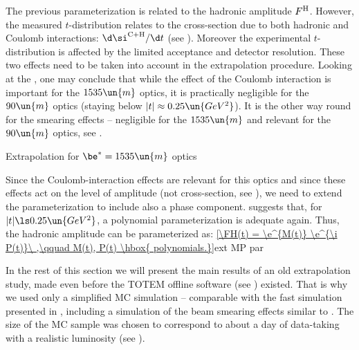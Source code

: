 
The previous parameterization is related to the hadronic amplitude $F^{\rm H}$. However, the measured $t$-distribution relates to the cross-section due to both hadronic and Coulomb interactions: $\d\si^{\rm C+H}/\d t$ (see ). Moreover the experimental $t$-distribution is affected by the limited acceptance and detector resolution. These two effects need to be taken into account in the extrapolation procedure. Looking at the , one may conclude that while the effect of the Coulomb interaction is important for the $1535\un{m}$ optics, it is practically negligible for the $90\un{m}$ optics (staying below $|t| \approx 0.25\un{GeV^2}$). It is the other way round for the smearing effects -- negligible for the $1535\un{m}$ and relevant for the $90\un{m}$ optics, see .

\bmfig
{}
\emfig

\caption{Extrapolation for $\be^* = 1535\un{m}$ optics}

Since the Coulomb-interaction effects are relevant for this optics and since these effects act on the level of amplitude (not cross-section, see ), we need to extend the parameterization  to include also a phase component.  suggests that, for $|t| \ls 0.25\un{GeV^2}$, a polynomial parameterization is adequate again. Thus, the hadronic amplitude can be parameterized as:
\eqref{\FH(t) = \e^{M(t)} \e^{\i P(t)}\ ,\qquad M(t), P(t) \hbox{ polynomials.}}{ext MP par}

In the rest of this section we will present the main results of an old extrapolation study, made even before the TOTEM offline software (see ) existed. That is why we used only a simplified MC simulation -- comparable with the fast simulation presented in , including a simulation of the beam smearing effects similar to . The size of the MC sample was chosen to correspond to about a day of data-taking with a realistic luminosity (see ).

